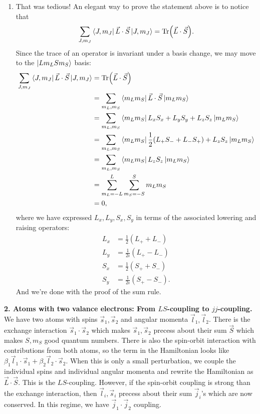 \documentclass{article}
\theoremstyle{definition}
\newcommand{\be}{\beta}
\newcommand{\f}[2]{\frac{#1}{#2}}
\begin{document}
\begin{enumerate}[label=(\alph*)]
	\item  That was tedious! An elegant way to prove the statement above is to notice that 
	\begin{align*}
	\sum_{J,m_J} \bra{J,m_J} \vec{L}\cdot \vec{S} \ket{J,m_J} = \Tr(\vec{L}\cdot \vec{S}).
	\end{align*}
	Since the trace of an operator is invariant under a basis change, we may move to the $\ket{Lm_L S m_S}$ basis: 
	\begin{align*}
	\sum_{J,m_J} \bra{J,m_J} \vec{L}\cdot \vec{S} \ket{J,m_J} &= \Tr(\vec{L}\cdot \vec{S}) \\
	&= \sum_{m_L,m_S} \bra{m_L m_S} \vec{L}\cdot \vec{S} \ket{m_L m_S} \\
	&= \sum_{m_L,m_S} \bra{m_L m_S} L_xS_x+L_yS_y+L_zS_z \ket{m_L m_S} \\
	&= \sum_{m_L,m_S} \bra{m_L m_S} \f{1}{2}(L_+S_- + L_-S_+)   +L_zS_z \ket{m_L m_S} \\
	&= \sum_{m_L,m_S} \bra{m_L m_S} L_zS_z \ket{m_L m_S} \\
	&= \sum_{m_L=-L}^L\sum_{m_S=-S}^S m_L m_S \\
	&= 0,
	\end{align*} 
	where we have expressed $L_x,L_y,S_x,S_y$ in terms of the associated lowering and raising operators:
	\begin{align*}
	L_x &= \f{1}{2}(L_+ + L_-)\\
	L_y &= \f{1}{2i}(L_+ - L_-)\\
	S_x &= \f{1}{2}(S_+ + S_-)\\
	S_y &= \f{1}{2i}(S_+ - S_-).
	\end{align*}
	And we're done with the proof of the sum rule. 
\end{enumerate}

\noindent \textbf{2. Atoms with two valance electrons: From $LS$-coupling to $jj$-coupling.} We have two atoms with spins $\vec{s}_1,\vec{s}_2$ and angular momenta $\vec{l}_1, \vec{l}_2$. There is the exchange interaction $\vec{s}_1 \cdot \vec{s}_2$ which makes $\vec{s}_1, \vec{s}_2$ precess about their sum $\vec{S}$ which makes $S,m_S$ good quantum numbers. There is also the spin-orbit interaction with contributions from both atoms, so the term in the Hamiltonian looks like $\be_1 \vec{l}_1 \cdot \vec{s}_1 + \be_2 \vec{l}_2 \cdot \vec{s}_2$. When this is only a small perturbation, we couple the individual spins and individual angular momenta and rewrite the Hamiltonian as $\vec{L}\cdot \vec{S}$. This is the $LS$-coupling.  However, if the spin-orbit coupling is strong than the exchange interaction, then $\vec{l}_i, \vec{s}_i$ precess about their sum $\vec{j}_i$'s which are now conserved. In this regime, we have $\vec{j}_1 \cdot \vec{j}_2$ coupling.  \\
\end{document}
